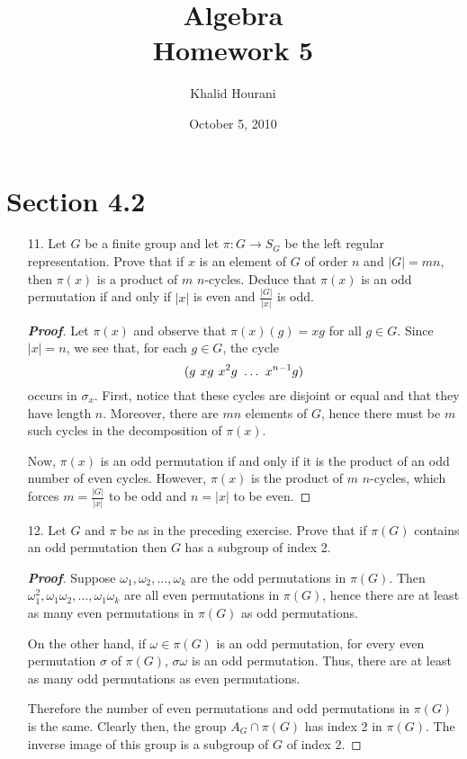 \documentclass[12pt,leqno]{book}
\title{Algebra\\\large Homework 5}
\date{October 5, 2010}
\author{Khalid Hourani}
\theoremstyle{definition}
\newenvironment{Proof}{\begin{proof}[\textnormal{\textbf{Proof}}]}{\end{proof}}
\begin{document}
 \begin{titlepage}
  \maketitle
 \end{titlepage}
\section*{Section 4.2}
\begin{enumerate}
 \item [11.] Let $G$ be a finite group and let $\pi:G\to S_G$ be the left regular representation. Prove that if $x$ is an element of $G$ of order $n$ and $|G|=mn$, then $\pi(x)$ is a product of $m$ $n$-cycles. Deduce that $\pi(x)$ is an odd permutation if and only if $|x|$ is even and $\frac{|G|}{|x|}$ is odd.

\begin{Proof}
 Let $\pi(x)$ and observe that $\pi(x)(g)=xg$ for all $g\in G$. Since $|x|=n$, we see that, for each $g\in G$, the cycle \[(g\hskip.05in xg\hskip.05inx^2g\hskip.05in\hdots\hskip.05in x^{n-1}g)\] occurs in $\sigma_x$. First, notice that these cycles are disjoint or equal and that they have length $n$. Moreover, there are $mn$ elements of $G$, hence there must be $m$ such cycles in the decomposition of $\pi(x)$.

Now, $\pi(x)$ is an odd permutation if and only if it is the product of an odd number of even cycles. However, $\pi(x)$ is the product of $m$ $n$-cycles, which forces $m=\frac{|G|}{|x|}$ to be odd and $n=|x|$ to be even.
\end{Proof}

 \item [12.] Let $G$ and $\pi$ be as in the preceding exercise. Prove that if $\pi(G)$ contains an odd permutation then $G$ has a subgroup of index 2.

\begin{Proof}
Suppose $\omega_1,\omega_2,\hdots,\omega_k$ are the odd permutations in $\pi(G)$. Then $\omega_1^2,\omega_1\omega_2,\hdots,\omega_1\omega_k$ are all even permutations in $\pi(G)$, hence there are at least as many even permutations in $\pi(G)$ as odd permutations.

On the other hand, if $\omega\in\pi(G)$ is an odd permutation, for every even permutation $\sigma$ of $\pi(G)$, $\sigma\omega$ is an odd permutation. Thus, there are at least as many odd permutations as even permutations.

Therefore the number of even permutations and odd permutations in $\pi(G)$ is the same. Clearly then, the group $A_G\cap\pi(G)$ has index 2 in $\pi(G)$. The inverse image of this group is a subgroup of $G$ of index 2. 
\end{Proof}

\end{enumerate}
\end{document}
